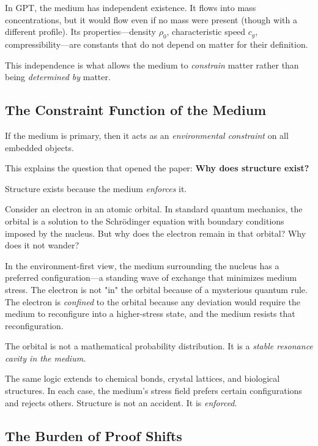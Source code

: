 \documentclass[12pt, a4paper]{article}
\begin{document}
In GPT, the medium has independent existence. It flows into mass concentrations, but it would flow even if no mass were present (though with a different profile). Its properties—density \(\rho_0\), characteristic speed \(c_g\), compressibility—are constants that do not depend on matter for their definition.

This independence is what allows the medium to \textit{constrain} matter rather than being \textit{determined by} matter.

\subsection{The Constraint Function of the Medium}
\label{subsec:constraint_function}

If the medium is primary, then it acts as an \textit{environmental constraint} on all embedded objects.

This explains the question that opened the paper: \textbf{Why does structure exist?}

Structure exists because the medium \textit{enforces} it.

Consider an electron in an atomic orbital. In standard quantum mechanics, the orbital is a solution to the Schrödinger equation with boundary conditions imposed by the nucleus. But why does the electron remain in that orbital? Why does it not wander?

In the environment-first view, the medium surrounding the nucleus has a preferred configuration—a standing wave of exchange that minimizes medium stress. The electron is not "in" the orbital because of a mysterious quantum rule. The electron is \textit{confined} to the orbital because any deviation would require the medium to reconfigure into a higher-stress state, and the medium resists that reconfiguration.

The orbital is not a mathematical probability distribution. It is a \textit{stable resonance cavity in the medium}.

The same logic extends to chemical bonds, crystal lattices, and biological structures. In each case, the medium's stress field prefers certain configurations and rejects others. Structure is not an accident. It is \textit{enforced}.

\subsection{The Burden of Proof Shifts}
\label{subsec:burden_shift}
\end{document}
